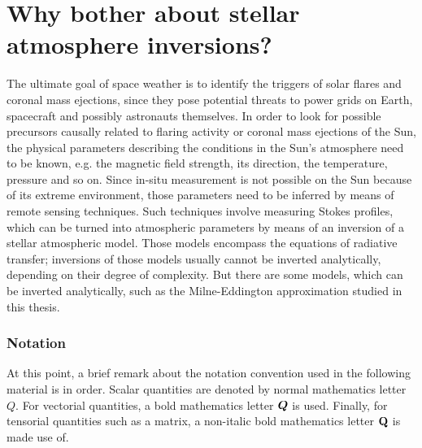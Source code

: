\documentclass[a4paper,12pt]{report}
\def\lk#1{{\color{black}{#1}}}
\begin{document}
\section{Why bother about stellar atmosphere inversions?}
The ultimate goal of space weather is to identify the triggers of solar flares and coronal mass ejections, since they pose potential threats to power grids on Earth, spacecraft and possibly astronauts themselves. In order to look for possible precursors causally related to flaring activity or coronal mass ejections of the Sun, the physical parameters describing the conditions in the Sun's atmosphere need to be known, e.g. the magnetic field strength, its direction, the temperature, pressure and so on. Since in-situ measurement is not possible on the Sun because of its extreme environment, those parameters need to be inferred by means of remote sensing techniques. Such techniques involve measuring Stokes profiles, which can be turned into atmospheric parameters by means of an inversion of a stellar atmospheric model. Those models encompass the equations of radiative transfer; inversions of those models usually cannot be inverted analytically, depending on their degree of complexity. But there are some models, which can be inverted analytically, such as the Milne-Eddington approximation studied in this thesis.








\subsubsection{Notation}
At this point, a brief remark about the notation convention used in the following material is in order. Scalar quantities are denoted by \lk{a} normal mathematics letter $Q$. For vectorial quantities, a bold mathematics letter $\bm{Q}$ is used. Finally, for tensorial quantities such as a matrix, a non-italic bold mathematics letter $\boldsymbol{\mathbf{Q}}$ is made use of.
\end{document}
